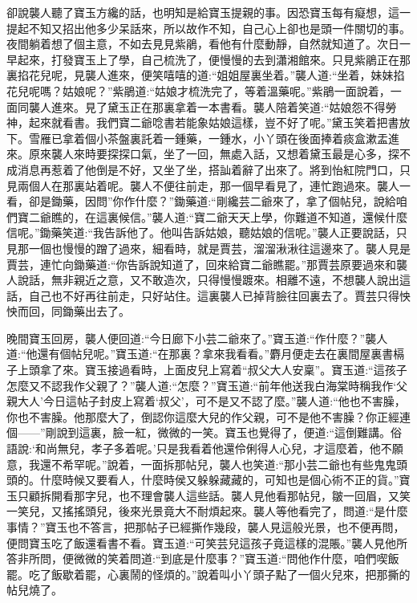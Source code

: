 \begin{parag}
    卻說襲人聽了寶玉方纔的話，也明知是給寶玉提親的事。因恐寶玉每有癡想，這一提起不知又招出他多少呆話來，所以故作不知，自己心上卻也是頭一件關切的事。夜間躺着想了個主意，不如去見見紫鵑，看他有什麼動靜，自然就知道了。次日一早起來，打發寶玉上了學，自己梳洗了，便慢慢的去到瀟湘館來。只見紫鵑正在那裏掐花兒呢，見襲人進來，便笑嘻嘻的道:“姐姐屋裏坐着。”襲人道:“坐着，妹妹掐花兒呢嗎？姑娘呢？”紫鵑道:“姑娘才梳洗完了，等着溫藥呢。”紫鵑一面說着，一面同襲人進來。見了黛玉正在那裏拿着一本書看。襲人陪着笑道:“姑娘怨不得勞神，起來就看書。我們寶二爺唸書若能象姑娘這樣，豈不好了呢。”黛玉笑着把書放下。雪雁已拿着個小茶盤裏託着一鍾藥，一鍾水，小丫頭在後面捧着痰盒漱盂進來。原來襲人來時要探探口氣，坐了一回，無處入話，又想着黛玉最是心多，探不成消息再惹着了他倒是不好，又坐了坐，搭訕着辭了出來了。將到怡紅院門口，只見兩個人在那裏站着呢。襲人不便往前走，那一個早看見了，連忙跑過來。襲人一看，卻是鋤藥，因問”你作什麼？”鋤藥道:“剛纔芸二爺來了，拿了個帖兒，說給咱們寶二爺瞧的，在這裏候信。”襲人道:“寶二爺天天上學，你難道不知道，還候什麼信呢。”鋤藥笑道:“我告訴他了。他叫告訴姑娘，聽姑娘的信呢。”襲人正要說話，只見那一個也慢慢的蹭了過來，細看時，就是賈芸，溜溜湫湫往這邊來了。襲人見是賈芸，連忙向鋤藥道:“你告訴說知道了，回來給寶二爺瞧罷。”那賈芸原要過來和襲人說話，無非親近之意，又不敢造次，只得慢慢踱來。相離不遠，不想襲人說出這話，自己也不好再往前走，只好站住。這裏襲人已掉背臉往回裏去了。賈芸只得怏怏而回，同鋤藥出去了。
\end{parag}


\begin{parag}
    晚間寶玉回房，襲人便回道:“今日廊下小芸二爺來了。”寶玉道:“作什麼？”襲人道:“他還有個帖兒呢。”寶玉道:“在那裏？拿來我看看。”麝月便走去在裏間屋裏書槅子上頭拿了來。寶玉接過看時，上面皮兒上寫着“叔父大人安稟”。寶玉道:“這孩子怎麼又不認我作父親了？”襲人道:“怎麼？”寶玉道:“前年他送我白海棠時稱我作‘父親大人’今日這帖子封皮上寫着‘叔父’，可不是又不認了麼。”襲人道:“他也不害臊，你也不害臊。他那麼大了，倒認你這麼大兒的作父親，可不是他不害臊？你正經連個——”剛說到這裏，臉一紅，微微的一笑。寶玉也覺得了，便道:“這倒難講。俗語說:‘和尚無兒，孝子多着呢。’只是我看着他還伶俐得人心兒，才這麼着，他不願意，我還不希罕呢。”說着，一面拆那帖兒，襲人也笑道:“那小芸二爺也有些鬼鬼頭頭的。什麼時候又要看人，什麼時侯又躲躲藏藏的，可知也是個心術不正的貨。”寶玉只顧拆開看那字兒，也不理會襲人這些話。襲人見他看那帖兒，皺一回眉，又笑一笑兒，又搖搖頭兒，後來光景竟大不耐煩起來。襲人等他看完了，問道:“是什麼事情？”寶玉也不答言，把那帖子已經撕作幾段，襲人見這般光景，也不便再問，便問寶玉吃了飯還看書不看。寶玉道:“可笑芸兒這孩子竟這樣的混賬。”襲人見他所答非所問，便微微的笑着問道:“到底是什麼事？”寶玉道:“問他作什麼，咱們喫飯罷。吃了飯歇着罷，心裏鬧的怪煩的。”說着叫小丫頭子點了一個火兒來，把那撕的帖兒燒了。
\end{parag}


